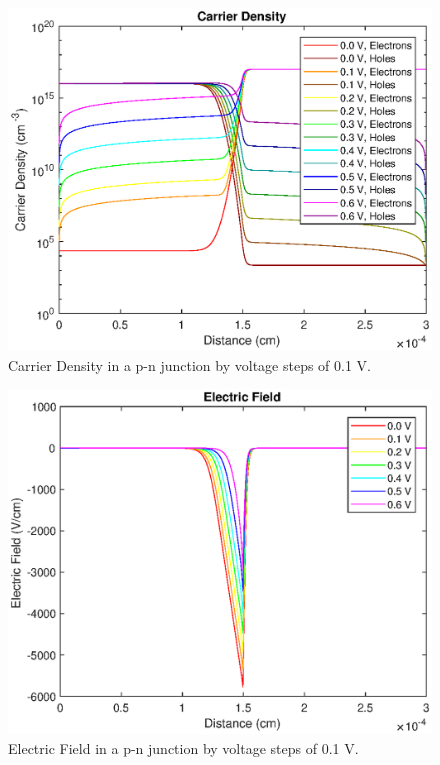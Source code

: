 \documentclass[12pt]{article}
\begin{document}
\begin{figure}
	\centering
	\includegraphics{CarrierDensityByVoltage}
	\caption{Carrier Density in a p-n junction by voltage steps of 0.1 V.}
\end{figure} 

\begin{figure}
	\centering
	\includegraphics{ElectricFieldByVoltage}
	\caption{Electric Field in a p-n junction by voltage steps of 0.1 V. }
\end{figure} 
\end{document}
